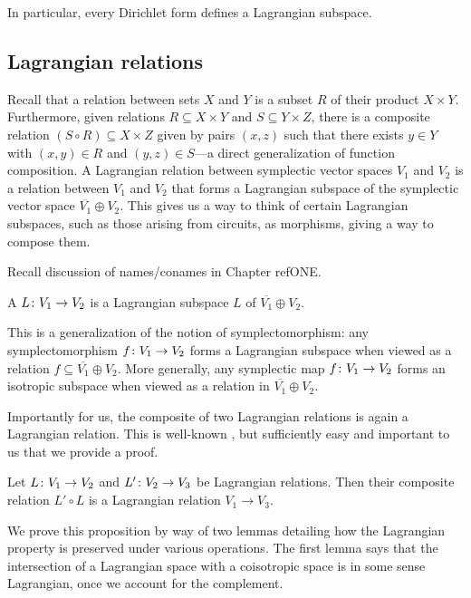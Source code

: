In particular, every Dirichlet form defines a Lagrangian subspace. 

\subsection{Lagrangian relations}

Recall that a relation between sets $X$ and $Y$ is a subset $R$ of their product
$X \times Y$. Furthermore, given relations $R \subseteq X \times Y$ and $S
\subseteq Y \times Z$, there is a composite relation $(S \circ R) \subseteq X
\times Z$ given by pairs $(x,z)$ such that there exists $y \in Y$ with $(x,y)
\in R$ and $(y,z) \in S$---a direct generalization of function composition. A
Lagrangian relation between symplectic vector spaces $V_1$ and $V_2$ is a
relation between $V_1$ and $V_2$ that forms a Lagrangian subspace of the
symplectic vector space $\overline{V_1} \oplus V_2$. This gives us a
way to think of certain Lagrangian subspaces, such as those arising from
circuits, as morphisms, giving a way to compose them.

Recall discussion of names/conames in Chapter refONE.
\begin{definition}
  A  $L{\colon} V_1 \to V_2$ is a Lagrangian subspace $L$
  of $\overline{V_1} \oplus V_2$. 
\end{definition}

This is a generalization of the notion of symplectomorphism: any symplectomorphism
$f{\colon} V_1 \to V_2$ forms a Lagrangian subspace when viewed as a
relation $f \subseteq \overline{V_1} \oplus V_2$. More generally, any symplectic
map $f{\colon} V_1 \to V_2$ forms an isotropic subspace when viewed as a relation in
$\overline{V_1} \oplus V_2$. 

Importantly for us, the composite of two Lagrangian relations is again a
Lagrangian relation.  This is well-known \cite{Weinstein}, but sufficiently 
easy and important to us that we provide a proof.

\begin{proposition} \label{prop:lagrangian_composition}
  Let $L{\colon} V_1 \to V_2$ and $L'{\colon} V_2 \to V_3$ be Lagrangian relations. Then their
  composite relation $L' \circ L$ is a Lagrangian relation $V_1 \to V_3$.
\end{proposition}

We prove this proposition by way of two lemmas detailing how the Lagrangian
property is preserved under various operations. The first lemma says that the
intersection of a Lagrangian space with a coisotropic space is in some sense
Lagrangian, once we account for the complement.

